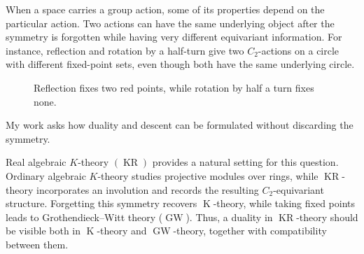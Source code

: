\documentclass[11pt]{article}
\newcommand{\KR}{\operatorname{KR}}
\newcommand{\K}{\operatorname{K}}
\newcommand{\GW}{\operatorname{GW}}
\begin{document}
When a space carries a group action, some of its properties depend on the particular action. 
Two actions can have the same underlying object after the symmetry is forgotten while having very different equivariant information.
For instance, reflection and rotation by a half-turn give two $C_2$-actions on a circle with different fixed-point sets, even though both have the same underlying circle.

\begin{figure}[h]
\centering
{}

\captionsetup{font=footnotesize,skip=0.3em}
\caption{Reflection fixes two red points, while rotation by half a turn fixes none.}
\label{fig:circle-actions}
\end{figure}
\noindent My work asks how duality and descent can be formulated without discarding the symmetry.

Real algebraic $K$-theory $(\KR)$ provides a natural setting for this question.
Ordinary algebraic $K$-theory studies projective modules over rings, while $\KR$-theory incorporates an involution and records the resulting $C_2$-equivariant structure.
Forgetting this symmetry recovers $\K$-theory, while taking fixed points leads to Grothendieck--Witt theory ($\GW$).
Thus, a duality in $\KR$-theory should be visible both in $\K$-theory and $\GW$-theory, together with compatibility between them.
\end{document}
